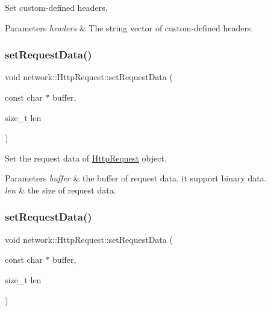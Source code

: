 Set custom-\/defined headers.


\begin{DoxyParams}{Parameters}
{\em headers} & The string vector of custom-\/defined headers. \\
\hline
\end{DoxyParams}
\mbox{\label{classnetwork_1_1HttpRequest_a819fd1cea3e4772de3ab45c6135c29e5}} 
\subsubsection{\texorpdfstring{set\+Request\+Data()}{setRequestData()}\hspace{0.1cm}{\footnotesize\ttfamily [1/2]}}
{\footnotesize\ttfamily void network\+::\+Http\+Request\+::set\+Request\+Data (\begin{DoxyParamCaption}\item[{const char $\ast$}]{buffer,  }\item[{size\+\_\+t}]{len }\end{DoxyParamCaption})\hspace{0.3cm}{\ttfamily [inline]}}

Set the request data of \hyperlink{classnetwork_1_1HttpRequest}{Http\+Request} object.


\begin{DoxyParams}{Parameters}
{\em buffer} & the buffer of request data, it support binary data. \\
\hline
{\em len} & the size of request data. \\
\hline
\end{DoxyParams}
\mbox{\label{classnetwork_1_1HttpRequest_a819fd1cea3e4772de3ab45c6135c29e5}} 
\subsubsection{\texorpdfstring{set\+Request\+Data()}{setRequestData()}\hspace{0.1cm}{\footnotesize\ttfamily [2/2]}}
{\footnotesize\ttfamily void network\+::\+Http\+Request\+::set\+Request\+Data (\begin{DoxyParamCaption}\item[{const char $\ast$}]{buffer,  }\item[{size\+\_\+t}]{len }\end{DoxyParamCaption})\hspace{0.3cm}{\ttfamily [inline]}}

